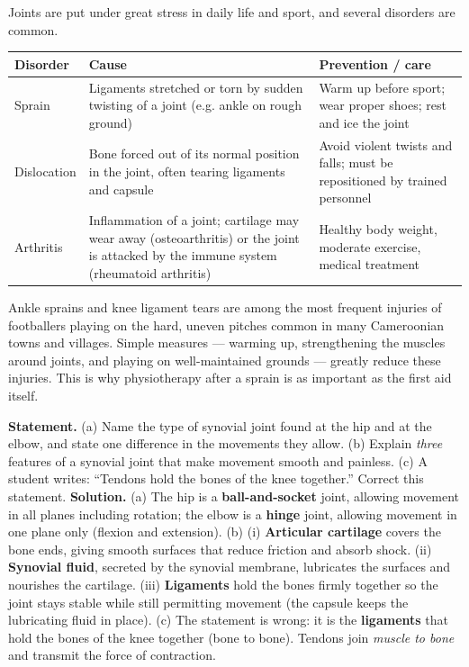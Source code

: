 \documentclass[11pt]{article}
\newcounter{popsec}
\newcounter{popsub}
\newcommand{\courssub}[1]{%
  \stepcounter{popsub}%
  \par\vspace{9pt}\noindent{\popxbold\fontsize{11.5}{13}\selectfont\color{popink}{\color{poporange}\thepopsec.\thepopsub}\hspace{6pt}#1}\par\nopagebreak\vspace{4pt}
}
\begin{document}
\courssub{Joint disorders and injuries}

Joints are put under great stress in daily life and sport, and several disorders are common.

\begin{center}
\begin{tabularx}{\linewidth}{|l|X|X|}
\hline
\rowcolor{popblueL} \textbf{Disorder} & \textbf{Cause} & \textbf{Prevention / care} \\
\hline
Sprain & Ligaments stretched or torn by sudden twisting of a joint (e.g. ankle on rough ground) & Warm up before sport; wear proper shoes; rest and ice the joint \\
\hline
Dislocation & Bone forced out of its normal position in the joint, often tearing ligaments and capsule & Avoid violent twists and falls; must be repositioned by trained personnel \\
\hline
Arthritis & Inflammation of a joint; cartilage may wear away (osteoarthritis) or the joint is attacked by the immune system (rheumatoid arthritis) & Healthy body weight, moderate exercise, medical treatment \\
\hline
\end{tabularx}
\end{center}

\begin{savaistu}
Ankle sprains and knee ligament tears are among the most frequent injuries of footballers playing on the hard, uneven pitches common in many Cameroonian towns and villages. Simple measures --- warming up, strengthening the muscles around joints, and playing on well-maintained grounds --- greatly reduce these injuries. This is why physiotherapy after a sprain is as important as the first aid itself.
\end{savaistu}

\begin{exoresolu}
\textbf{Statement.} (a) Name the type of synovial joint found at the hip and at the elbow, and state one difference in the movements they allow. (b) Explain \emph{three} features of a synovial joint that make movement smooth and painless. (c) A student writes: ``Tendons hold the bones of the knee together.'' Correct this statement.
\tcblower
\textbf{Solution.} (a) The hip is a \textbf{ball-and-socket} joint, allowing movement in all planes including rotation; the elbow is a \textbf{hinge} joint, allowing movement in one plane only (flexion and extension).
(b) (i) \textbf{Articular cartilage} covers the bone ends, giving smooth surfaces that reduce friction and absorb shock. (ii) \textbf{Synovial fluid}, secreted by the synovial membrane, lubricates the surfaces and nourishes the cartilage. (iii) \textbf{Ligaments} hold the bones firmly together so the joint stays stable while still permitting movement (the capsule keeps the lubricating fluid in place).
(c) The statement is wrong: it is the \textbf{ligaments} that hold the bones of the knee together (bone to bone). Tendons join \emph{muscle to bone} and transmit the force of contraction.
\end{exoresolu}
\end{document}
